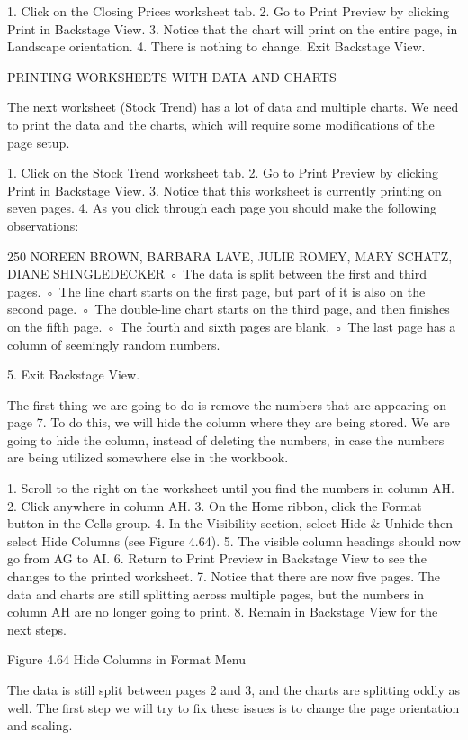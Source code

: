 1.   Click on the Closing Prices worksheet tab.
2.   Go to Print Preview by clicking Print in Backstage View.
3.   Notice that the chart will print on the entire page, in Landscape orientation.
4.   There is nothing to change. Exit Backstage View.

PRINTING WORKSHEETS WITH DATA AND CHARTS

The next worksheet (Stock Trend) has a lot of data and multiple charts. We need to print the data and
the charts, which will require some modifications of the page setup.

1.   Click on the Stock Trend worksheet tab.
2.   Go to Print Preview by clicking Print in Backstage View.
3.   Notice that this worksheet is currently printing on seven pages.
4.   As you click through each page you should make the following observations:

250 NOREEN BROWN, BARBARA LAVE, JULIE ROMEY, MARY SCHATZ, DIANE SHINGLEDECKER
◦ The data is split between the first and third pages.
◦ The line chart starts on the first page, but part of it is also on the second page.
◦ The double-line chart starts on the third page, and then finishes on the fifth page.
◦ The fourth and sixth pages are blank.
◦ The last page has a column of seemingly random numbers.

5. Exit Backstage View.

The first thing we are going to do is remove the numbers that are appearing on page 7. To do this,
we will hide the column where they are being stored. We are going to hide the column, instead of
deleting the numbers, in case the numbers are being utilized somewhere else in the workbook.

1. Scroll to the right on the worksheet until you find the numbers in column AH.
2. Click anywhere in column AH.
3. On the Home ribbon, click the Format button in the Cells group.
4. In the Visibility section, select Hide & Unhide then select Hide Columns (see Figure 4.64).
5. The visible column headings should now go from AG to AI.
6. Return to Print Preview in Backstage View to see the changes to the printed worksheet.
7. Notice that there are now five pages. The data and charts are still splitting across multiple
pages, but the numbers in column AH are no longer going to print.
8. Remain in Backstage View for the next steps.




Figure 4.64 Hide Columns in Format Menu


The data is still split between pages 2 and 3, and the charts are splitting oddly as well. The first step
we will try to fix these issues is to change the page orientation and scaling.

